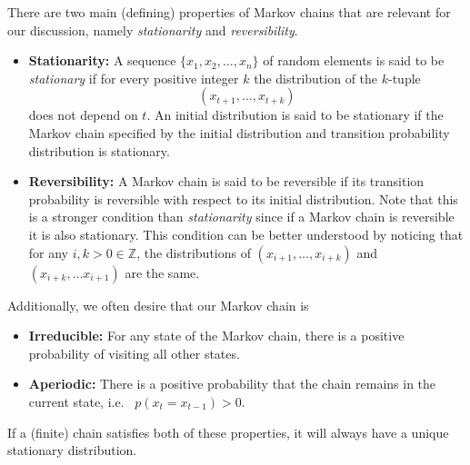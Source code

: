 \documentclass[../main.tex]{subfiles}
\begin{document}
There are two main (defining) properties of Markov chains that are relevant for our discussion, namely
\emph{stationarity} and \emph{reversibility}.
%
\begin{itemize}
  \item \textbf{Stationarity:} A sequence $\{x_1, x_2, \ldots, x_n\}$ of random elements is said to be
    \emph{stationary} if for every positive integer $k$ the distribution of the $k$-tuple
    \begin{equation*}
      (x_{t+1}, \ldots, x_{t+k})
    \end{equation*}
    does not depend on $t$. An initial distribution is said to be stationary if the Markov chain specified by the
    initial distribution and transition probability distribution is stationary. 
  \item \textbf{Reversibility:} A Markov chain is said to be reversible if its transition probability is reversible
    with respect to its initial distribution. Note that this is a stronger condition than \emph{stationarity} since if
    a Markov chain is reversible it is also stationary. This condition can be better understood by noticing that for
    any $i, k  > 0 \in \mathbb{Z}$, the distributions of $(x_{i+1}, \ldots, x_{i+k})$ and $(x_{i+k}, \ldots x_{i+1})$
    are the same.
\end{itemize}
%
Additionally, we often desire that our Markov chain is
\begin{itemize}
  \item \textbf{Irreducible:} For any state of the Markov chain, there is a positive probability of visiting all other
    states.
  \item \textbf{Aperiodic:} There is a positive probability that the chain remains in the current state, i.e.\ %
    $p{(x_t = x_{t-1})} > 0$.
\end{itemize}
If a (finite) chain satisfies both of these properties, it will always have a unique stationary distribution.

%
%
%
\end{document}
